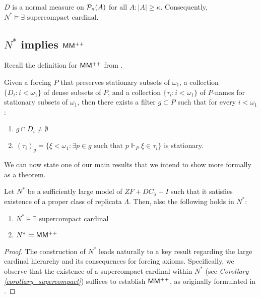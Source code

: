 \begin{corollary}\label{corollary_supercompact}
    $D$ is a normal measure on $\mathcal{P}_\kappa(A)$ for all $A: |A| \geq \kappa$. Consequently, $N^\ast \models \exists \text{ supercompact cardinal}$.
\end{corollary}

\subsection{$N^\ast$ implies ${\sf MM^{++}}$}\label{subsection_nstar_model}

Recall the definition for ${\sf MM^{++}}$ from \cite{aspero2021sf}.

\begin{definition}
    Given a forcing \( P \) that preserves stationary subsets of \( \omega_1 \), a collection \(\{D_i : i < \omega_1\}\) of dense subsets of \( P \), and a collection \(\{\tau_i : i < \omega_1\}\) of \( P \)-names for stationary subsets of \( \omega_1 \), then there exists a filter \( g \subset P \) such that for every \( i < \omega_1 \):
    \begin{enumerate}[label=(\roman*)]
        \item \( g \cap D_i \neq \emptyset \) 
        \item \( (\tau_i)_g = \{\xi < \omega_1 : \exists p \in g \text{ such that } p \Vdash_{P}  \xi \in \tau_i\} \) is stationary.
    \end{enumerate}
\end{definition}

We can now state one of our main results that we intend to show more formally as a theorem.

\begin{theorem}\label{theorem_nstar}
Let $N^\ast$ be a sufficiently large model of $ZF+DC_\lambda+I$ such that it satisfies existence of a proper class of replicata $\Lambda$. Then, also the following holds in $N^\ast$:
    \begin{enumerate}[label=(\roman*)]
        \item $N^\ast \models \exists \text{ supercompact cardinal}$
        \item $N^\ast \models {\sf MM^{++}}$
    \end{enumerate}
\end{theorem}

\begin{proof}
    The construction of $N^\ast$ leads naturally to a key result regarding the large cardinal hierarchy and its consequences for forcing axioms. Specifically, we observe that the existence of a supercompact cardinal within $N^\ast$ (see \textit{Corollary \ref{corollary_supercompact}}) suffices to establish ${\sf MM^{++}}$, as originally formulated in \cite{aspero2021sf}.
\end{proof}

